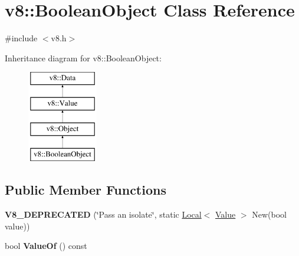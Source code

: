 \hypertarget{classv8_1_1BooleanObject}{}\section{v8\+:\+:Boolean\+Object Class Reference}
\label{classv8_1_1BooleanObject}


{\ttfamily \#include $<$v8.\+h$>$}

Inheritance diagram for v8\+:\+:Boolean\+Object\+:\begin{figure}[H]
\begin{center}
\leavevmode
\includegraphics[height=4.000000cm]{classv8_1_1BooleanObject}
\end{center}
\end{figure}
\subsection*{Public Member Functions}
\begin{DoxyCompactItemize}
\item 
{\bfseries V8\+\_\+\+D\+E\+P\+R\+E\+C\+A\+T\+ED} (\char`\"{}Pass an isolate\char`\"{}, static \hyperlink{classv8_1_1Local}{Local}$<$ \hyperlink{classv8_1_1Value}{Value} $>$ New(bool value))\hypertarget{classv8_1_1BooleanObject_ae13a7178a7ee05969b97fa5b0d22cd52}{}\label{classv8_1_1BooleanObject_ae13a7178a7ee05969b97fa5b0d22cd52}

\item 
bool {\bfseries Value\+Of} () const \hypertarget{classv8_1_1BooleanObject_a283419656e641bcd9588dee56c0a0686}{}\label{classv8_1_1BooleanObject_a283419656e641bcd9588dee56c0a0686}

\end{DoxyCompactItemize}
